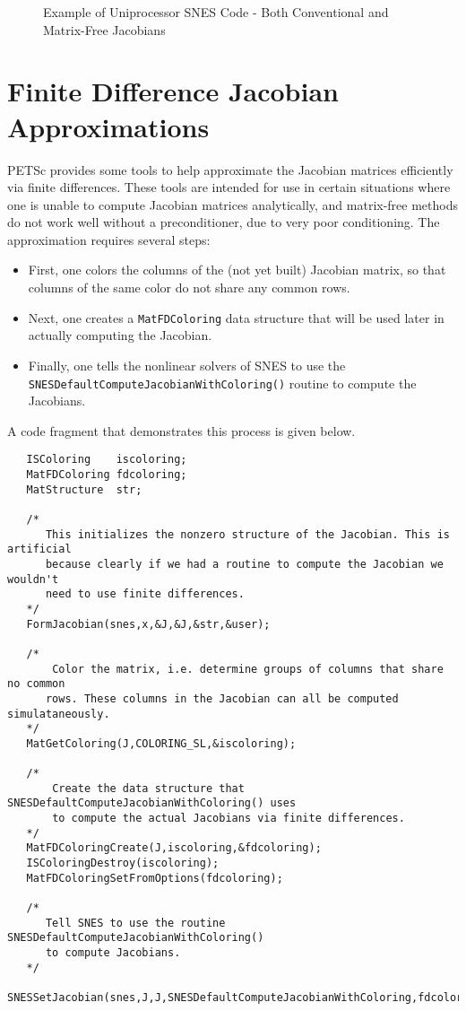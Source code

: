 \begin{figure}[H]
{\small
{}
}
\caption{Example of Uniprocessor SNES Code - Both Conventional and Matrix-Free Jacobians}
\label{fig:snesexample2}
\end{figure} 

\section{Finite Difference Jacobian Approximations}
\label{sec:fdmatrix}

PETSc provides some tools to help approximate the Jacobian matrices efficiently via 
finite differences.  These tools are intended for use in certain situations where
one is unable to compute Jacobian matrices analytically, and matrix-free methods
do not work well without a preconditioner, due to very poor conditioning.  
The approximation requires several steps:
\begin{itemize}
\item First, one colors the columns of the (not yet built) Jacobian matrix, so that 
      columns of the same color do not share any common rows.
\item Next, one creates a {\tt MatFDColoring} data structure that will be used later in 
      actually computing the Jacobian.
\item Finally, one tells the nonlinear solvers of SNES to use the
      {\tt SNESDefaultComputeJacobianWithColoring()}
      routine to compute the Jacobians. 
\end{itemize}
A code fragment that demonstrates this process is given below.
\begin{verbatim}
   ISColoring    iscoloring;
   MatFDColoring fdcoloring;
   MatStructure  str;

   /* 
      This initializes the nonzero structure of the Jacobian. This is artificial
      because clearly if we had a routine to compute the Jacobian we wouldn't
      need to use finite differences.
   */
   FormJacobian(snes,x,&J,&J,&str,&user);

   /*
       Color the matrix, i.e. determine groups of columns that share no common 
      rows. These columns in the Jacobian can all be computed simulataneously.
   */
   MatGetColoring(J,COLORING_SL,&iscoloring);

   /*
       Create the data structure that SNESDefaultComputeJacobianWithColoring() uses
       to compute the actual Jacobians via finite differences.
   */
   MatFDColoringCreate(J,iscoloring,&fdcoloring);
   ISColoringDestroy(iscoloring);
   MatFDColoringSetFromOptions(fdcoloring);

   /*
      Tell SNES to use the routine SNESDefaultComputeJacobianWithColoring()
      to compute Jacobians.
   */
   SNESSetJacobian(snes,J,J,SNESDefaultComputeJacobianWithColoring,fdcoloring);

\end{verbatim}

